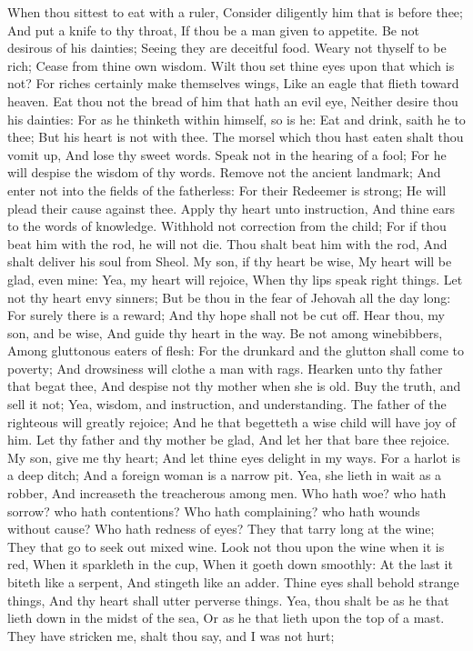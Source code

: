 When thou sittest to eat with a ruler, Consider diligently him that is before thee;  And put a knife to thy throat, If thou be a man given to appetite.  Be not desirous of his dainties; Seeing they are deceitful food.  Weary not thyself to be rich; Cease from thine own wisdom.  Wilt thou set thine eyes upon that which is not? For riches certainly make themselves wings, Like an eagle that flieth toward heaven.  Eat thou not the bread of him that hath an evil eye, Neither desire thou his dainties:  For as he thinketh within himself, so is he: Eat and drink, saith he to thee; But his heart is not with thee.  The morsel which thou hast eaten shalt thou vomit up, And lose thy sweet words.  Speak not in the hearing of a fool; For he will despise the wisdom of thy words.  Remove not the ancient landmark; And enter not into the fields of the fatherless:  For their Redeemer is strong; He will plead their cause against thee.  Apply thy heart unto instruction, And thine ears to the words of knowledge.  Withhold not correction from the child; For if thou beat him with the rod, he will not die.  Thou shalt beat him with the rod, And shalt deliver his soul from Sheol.  My son, if thy heart be wise, My heart will be glad, even mine:  Yea, my heart will rejoice, When thy lips speak right things.  Let not thy heart envy sinners; But be thou in the fear of Jehovah all the day long:  For surely there is a reward; And thy hope shall not be cut off.  Hear thou, my son, and be wise, And guide thy heart in the way.  Be not among winebibbers, Among gluttonous eaters of flesh:  For the drunkard and the glutton shall come to poverty; And drowsiness will clothe a man with rags.  Hearken unto thy father that begat thee, And despise not thy mother when she is old.  Buy the truth, and sell it not; Yea, wisdom, and instruction, and understanding.  The father of the righteous will greatly rejoice; And he that begetteth a wise child will have joy of him.  Let thy father and thy mother be glad, And let her that bare thee rejoice.  My son, give me thy heart; And let thine eyes delight in my ways.  For a harlot is a deep ditch; And a foreign woman is a narrow pit.  Yea, she lieth in wait as a robber, And increaseth the treacherous among men.  Who hath woe? who hath sorrow? who hath contentions? Who hath complaining? who hath wounds without cause? Who hath redness of eyes?  They that tarry long at the wine; They that go to seek out mixed wine.  Look not thou upon the wine when it is red, When it sparkleth in the cup, When it goeth down smoothly:  At the last it biteth like a serpent, And stingeth like an adder.  Thine eyes shall behold strange things, And thy heart shall utter perverse things.  Yea, thou shalt be as he that lieth down in the midst of the sea, Or as he that lieth upon the top of a mast.  They have stricken me, shalt thou say, and I was not hurt; 